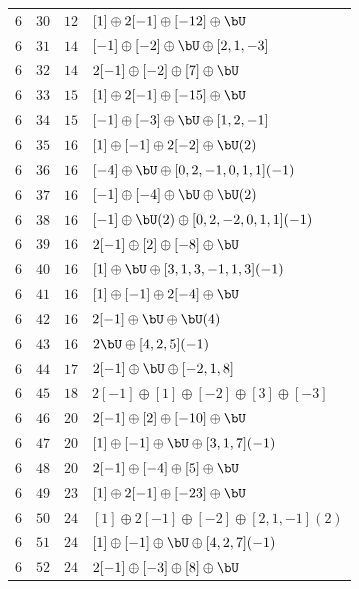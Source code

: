 \begin{center}
\begin{longtable}{llll}
 \(6\) & \(30\) & \(12\) & \([1] \oplus 2[-1] \oplus [-12] \oplus \bU\) \\
 \(6\) & \(31\) & \(14\) & \([-1] \oplus [-2] \oplus \bU \oplus [2, 1, -3]\) \\
 \(6\) & \(32\) & \(14\) & \(2 [-1] \oplus [-2] \oplus [7] \oplus \bU\) \\
 \(6\) & \(33\) & \(15\) & \([1] \oplus 2[-1] \oplus [-15] \oplus \bU\) \\
 \(6\) & \(34\) & \(15\) & \([-1] \oplus [-3] \oplus \bU \oplus [1, 2, -1]\) \\
 \(6\) & \(35\) & \(16\) & \([1] \oplus [-1] \oplus 2 [-2] \oplus \bU(2)\) \\
 \(6\) & \(36\) & \(16\) & \([-4] \oplus \bU \oplus [0, 2, -1, 0, 1, 1](-1)\) \\
 \(6\) & \(37\) & \(16\) & \([-1] \oplus [-4] \oplus \bU \oplus \bU(2)\) \\
 \(6\) & \(38\) & \(16\) & \([-1] \oplus \bU(2) \oplus [0, 2, -2, 0, 1, 1](-1)\) \\
 \(6\) & \(39\) & \(16\) & \(2 [-1] \oplus [2] \oplus [-8] \oplus \bU\) \\
 \(6\) & \(40\) & \(16\) & \([1] \oplus \bU \oplus [3, 1, 3, -1, 1, 3](-1)\) \\
 \(6\) & \(41\) & \(16\) & \([1] \oplus [-1] \oplus 2 [-4] \oplus \bU\) \\
 \(6\) & \(42\) & \(16\) & \(2 [-1] \oplus \bU \oplus \bU(4)\) \\
 \(6\) & \(43\) & \(16\) & \(2 \bU \oplus [4, 2, 5](-1)\) \\
 \(6\) & \(44\) & \(17\) & \(2 [-1] \oplus \bU \oplus [-2, 1, 8]\) \\
 \(6\) & \(45\) & \(18\) & \(2 [-1] \oplus [1] \oplus [-2] \oplus [3] \oplus [-3]\) \\
 \(6\) & \(46\) & \(20\) & \(2 [-1] \oplus [2] \oplus [-10] \oplus \bU\) \\
 \(6\) & \(47\) & \(20\) & \([1] \oplus [-1] \oplus \bU \oplus [3, 1, 7](-1)\) \\
 \(6\) & \(48\) & \(20\) & \(2 [-1] \oplus [-4] \oplus [5] \oplus \bU\) \\
 \(6\) & \(49\) & \(23\) & \([1] \oplus 2[-1] \oplus [-23] \oplus \bU\) \\
 \(6\) & \(50\) & \(24\) & \([1] \oplus 2[-1] \oplus [-2] \oplus [2, 1, -1](2)\) \\
 \(6\) & \(51\) & \(24\) & \([1] \oplus [-1] \oplus \bU \oplus [4, 2, 7](-1)\) \\
 \(6\) & \(52\) & \(24\) & \(2 [-1] \oplus [-3] \oplus [8] \oplus \bU\) \\

\end{longtable}
\end{center}
